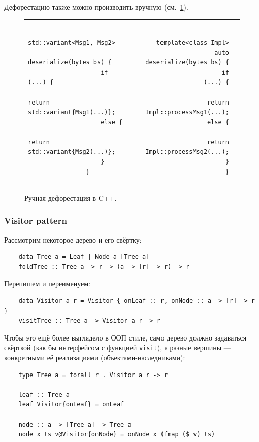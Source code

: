 Дефорестацию также можно производить вручную (см.~\ref{fig:cpp-deforestation}).
\begin{figure}
    \centering
    \begin{tabular}{p{} rl}
        \begin{minipage}[t]{0.5\textwidth}
            \begin{verbatim}
                std::variant<Msg1, Msg2>
                    deserialize(bytes bs) {
                    if (...) {
                        return std::variant{Msg1(...)};
                    else {
                        return std::variant{Msg2(...)};
                    }
                }
            \end{verbatim}
        \end{minipage}
        &
        \begin{minipage}[t]{0.5\textwidth}
            \begin{verbatim}
                template<class Impl>
                auto deserialize(bytes bs) {
                    if (...) {
                        return Impl::processMsg1(...);
                    else {
                        return Impl::processMsg2(...);
                    }
                }
            \end{verbatim}
        \end{minipage}
    \end{tabular}
    \caption{Ручная дефорестация в C++.}
    \label{fig:cpp-deforestation}
\end{figure}

\subsubsection{Visitor pattern} \label{subsubsec:visitor}

Рассмотрим некоторое дерево и его свёртку:
\begin{verbatim}
    data Tree a = Leaf | Node a [Tree a]
    foldTree :: Tree a -> r -> (a -> [r] -> r) -> r
\end{verbatim}

Перепишем и переименуем:
\begin{verbatim}
    data Visitor a r = Visitor { onLeaf :: r, onNode :: a -> [r] -> r }
    visitTree :: Tree a -> Visitor a r -> r
\end{verbatim}

Чтобы это ещё более выглядело в ООП стиле, само дерево должно задаваться свёрткой (как бы интерфейсом с функцией \texttt{visit}), а разные вершины --- конкретными её реализациями (объектами-наследниками):
\begin{verbatim}
    type Tree a = forall r . Visitor a r -> r

    leaf :: Tree a
    leaf Visitor{onLeaf} = onLeaf

    node :: a -> [Tree a] -> Tree a
    node x ts v@Visitor{onNode} = onNode x (fmap ($ v) ts)
\end{verbatim}

